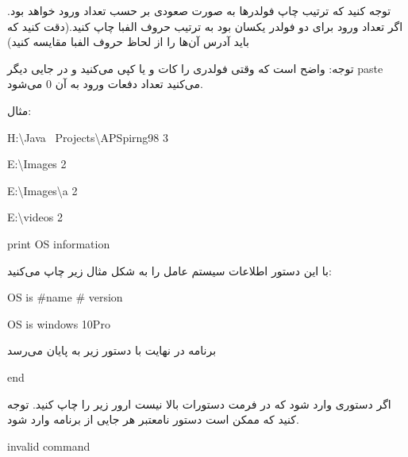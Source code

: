 \documentclass[]{article}
\begin{document}
توجه کنید که ترتیب چاپ فولدرها به صورت صعودی بر حسب تعداد ورود خواهد بود. اگر تعداد ورود برای دو فولدر یکسان بود به ترتیب حروف الفبا چاپ کنید.(دقت کنید که باید آدرس آن‌ها را از لحاظ حروف الفبا مقایسه کنید)


توجه: واضح است که وقتی فولدری را کات و یا کپی می‌کنید و در جایی دیگر paste می‌کنید تعداد دفعات ورود به آن 0 می‌شود.


مثال:

\begin{tcolorbox}[boxrule=0pt]
	\begin{latin}
  	  \large{
H:\textbackslash Java ~Projects\textbackslash APSpirng98 3

E:\textbackslash Images 2

E:\textbackslash Images\textbackslash a 2

E:\textbackslash videos 2

		}
	\end{latin}
\end{tcolorbox}

\begin{tcolorbox}[boxrule=0pt]
	\begin{latin}
  	  \large{
print OS information
		}
	\end{latin}
\end{tcolorbox}


با این دستور اطلاعات سیستم عامل را به شکل مثال زیر چاپ می‌کنید:

\begin{tcolorbox}[boxrule=0pt]
	\begin{latin}
  	  \large{
OS is \#name \# version

OS is windows 10Pro
		}
	\end{latin}
\end{tcolorbox}

برنامه در نهایت با دستور زیر به پایان می‌رسد

\begin{tcolorbox}[boxrule=0pt]
	\begin{latin}
  	  \large{
end
		}
	\end{latin}
\end{tcolorbox}


اگر دستوری وارد شود که در فرمت دستورات بالا نیست ارور زیر را چاپ کنید.
توجه کنید که ممکن است دستور نامعتبر هر جایی از برنامه وارد شود.


\begin{tcolorbox}[boxrule=0pt]
	\begin{latin}
  	  \large{
invalid command
		}
	\end{latin}
\end{tcolorbox}
\end{document}
